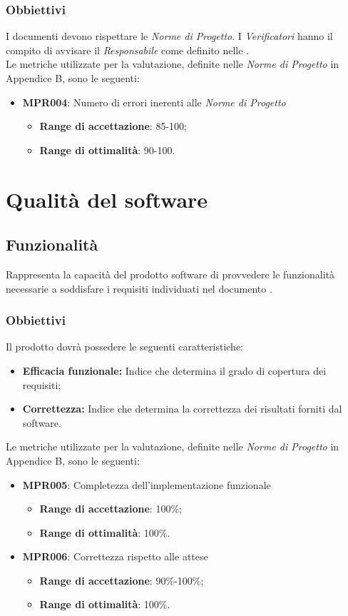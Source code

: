 \subsubsection{Obbiettivi}
I documenti devono rispettare le \textit{Norme di Progetto}. I \textit{Verificatori} hanno il compito di avvisare il \textit{Responsabile} come definito nelle \normediprogetto.\\
Le metriche utilizzate per la valutazione, definite nelle \textit{Norme di Progetto} in Appendice B, sono le seguenti:
\begin{itemize}
	\item \textbf{MPR004}: Numero di errori inerenti alle \textit{Norme di Progetto}
	\begin{itemize}
		\item \textbf{Range di accettazione}: 85-100;
		\item \textbf{Range di ottimalità}: 90-100.
	\end{itemize}
\end{itemize}

\section{Qualità del software}
\label{software}

\subsection{Funzionalità}
Rappresenta la capacità del prodotto software di provvedere le funzionalità necessarie a soddisfare i requisiti individuati nel documento \analisideirequisiti.
\subsubsection{Obbiettivi }Il prodotto dovrà possedere le seguenti caratteristiche:
\begin{itemize}
	\item \textbf{Efficacia funzionale:} Indice che determina il grado di copertura dei requisiti;
	\item \textbf{Correttezza:} Indice che determina la correttezza dei risultati forniti dal software.
\end{itemize}

Le metriche utilizzate per la valutazione, definite nelle \textit{Norme di Progetto} in Appendice B, sono le seguenti:
\begin{itemize}
	\item \textbf{MPR005}: Completezza dell'implementazione funzionale
	\begin{itemize}
		\item \textbf{Range di accettazione}: 100\%;
		\item \textbf{Range di ottimalità}: 100\%.
	\end{itemize}
	\item \textbf{MPR006}: Correttezza rispetto alle attese
	\begin{itemize}
		\item \textbf{Range di accettazione}: 90\%-100\%;
		\item \textbf{Range di ottimalità}: 100\%.
	\end{itemize}
\end{itemize}


